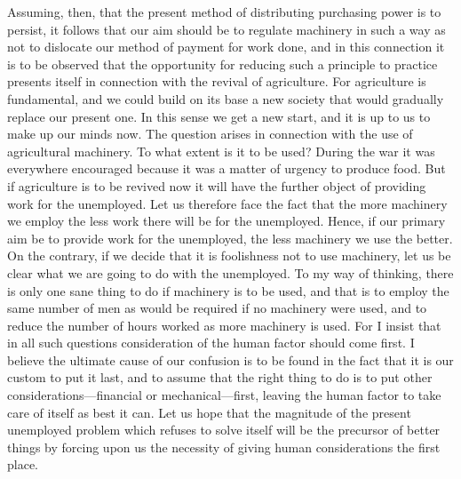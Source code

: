 \documentclass{book}
\begin{document}
Assuming, then, that the present method of distributing purchasing power is to persist, it follows that our aim should be to regulate machinery in such a way as not to dislocate our method of payment for work done, and in this connection it is to be observed that the opportunity for reducing such a principle to practice presents itself in connection with the revival of agriculture. For agriculture is fundamental, and we could build on its base a new society that would gradually replace our present one. In this sense we get a new start, and it is up to us to make up our minds now. The question arises in connection with the use of agricultural machinery. To what extent is it to be used? During the war it was everywhere encouraged because it was a matter of urgency to produce food. But if agriculture is to be revived now it will have the further object of providing work for the unemployed. Let us therefore face the fact that the more machinery we employ the less work there will be for the unemployed. Hence, if our primary aim be to provide work for the unemployed, the less machinery we use the better. On the contrary, if we decide that it is foolishness not to use machinery, let us be clear what we are going to do with the unemployed. To my way of thinking, there is only one sane thing to do if machinery is to be used, and that is to employ the same number of men as would be required if no machinery were used, and to reduce the number of hours worked as more machinery is used. For I insist that in all such questions consideration of the human factor should come first. I believe the ultimate cause of our confusion is to be found in the fact that it is our custom to put it last, and to assume that the right thing to do is to put other considerations—financial or mechanical—first, leaving the human factor to take care of itself as best it can. Let us hope that the magnitude of the present unemployed problem which refuses to solve itself will be the precursor of better things by forcing upon us the necessity of giving human considerations the first place.
\end{document}
